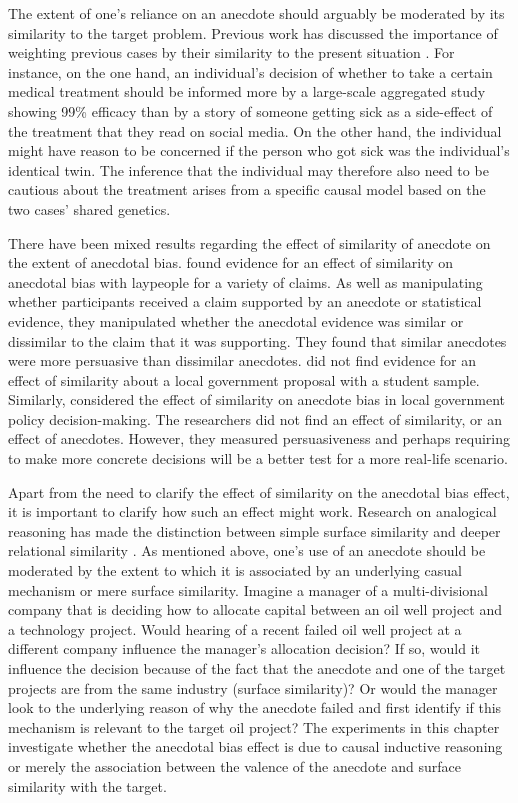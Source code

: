\documentclass[a4paper, nobind, dvipsnames]{templates/ociamthesis}
\theoremstyle{definition}
\theoremstyle{definition}
\theoremstyle{definition}
\theoremstyle{definition}
\theoremstyle{remark}
\begin{document}
The extent of one's reliance on an anecdote should arguably be moderated by its
similarity to the target problem. Previous work has discussed the importance of
weighting previous cases by their similarity to the present situation
\autocite{gilboa1995,lovallo2012}. For instance, on the one hand, an individual's
decision of whether to take a certain medical treatment should be informed more
by a large-scale aggregated study showing 99\% efficacy than by a story of
someone getting sick as a side-effect of the treatment that they read on social
media. On the other hand, the individual might have reason to be concerned if
the person who got sick was the individual's identical twin. The inference that
the individual may therefore also need to be cautious about the treatment arises
from a specific causal model based on the two cases' shared genetics.

There have been mixed results regarding the effect of similarity of anecdote on
the extent of anecdotal bias. \textcite[Study 3]{hoeken2009} found evidence for an effect
of similarity on anecdotal bias with laypeople for a variety of claims. As well
as manipulating whether participants received a claim supported by an anecdote
or statistical evidence, they manipulated whether the anecdotal evidence was
similar or dissimilar to the claim that it was supporting. They found that
similar anecdotes were more persuasive than dissimilar anecdotes. \textcite{hoeken2001}
did not find evidence for an effect of similarity about a local government
proposal with a student sample. Similarly, \textcite{hornikx2018} considered the effect of
similarity on anecdote bias in local government policy decision-making. The
researchers did not find an effect of similarity, or an effect of anecdotes.
However, they measured persuasiveness and perhaps requiring to make more
concrete decisions will be a better test for a more real-life scenario.

Apart from the need to clarify the effect of similarity on the anecdotal bias
effect, it is important to clarify how such an effect might work. Research on
analogical reasoning has made the distinction between simple surface similarity
and deeper relational similarity \autocite{gentner1983}. As mentioned above, one's use
of an anecdote should be moderated by the extent to which it is associated by an
underlying casual mechanism or mere surface similarity. Imagine a manager of a
multi-divisional company that is deciding how to allocate capital between an oil
well project and a technology project. Would hearing of a recent failed oil well
project at a different company influence the manager's allocation decision? If
so, would it influence the decision because of the fact that the anecdote and
one of the target projects are from the same industry (surface similarity)? Or
would the manager look to the underlying reason of why the anecdote failed and
first identify if this mechanism is relevant to the target oil project? The
experiments in this chapter investigate whether the anecdotal bias effect is due
to causal inductive reasoning or merely the association between the valence of
the anecdote and surface similarity with the target.
\end{document}
